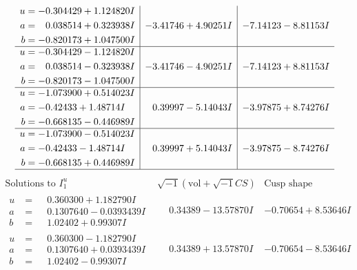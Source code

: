 \documentclass[1p]{elsarticle_modified}
\theoremstyle{definition}
\newcommand{\I}{\sqrt{-1}}
\begin{document}
$$\begin{array}{c|c|c}
\begin{aligned}
u &= -0.304429 + 1.124820 I \\
a &= \phantom{-}0.038514 + 0.323938 I \\
b &= -0.820173 + 1.047500 I\end{aligned}
 & -3.41746 + 4.90251 I & -7.14123 - 8.81153 I \\ \hline\begin{aligned}
u &= -0.304429 - 1.124820 I \\
a &= \phantom{-}0.038514 - 0.323938 I \\
b &= -0.820173 - 1.047500 I\end{aligned}
 & -3.41746 - 4.90251 I & -7.14123 + 8.81153 I \\ \hline\begin{aligned}
u &= -1.073900 + 0.514023 I \\
a &= -0.42433 + 1.48714 I \\
b &= -0.668135 - 0.446989 I\end{aligned}
 & \phantom{-}0.39997 - 5.14043 I & -3.97875 + 8.74276 I \\ \hline\begin{aligned}
u &= -1.073900 - 0.514023 I \\
a &= -0.42433 - 1.48714 I \\
b &= -0.668135 + 0.446989 I\end{aligned}
 & \phantom{-}0.39997 + 5.14043 I & -3.97875 - 8.74276 I\\
 \hline 
 \end{array}$$\newpage$$\begin{array}{c|c|c}  
\text{Solutions to }I^u_{1}& \I (\text{vol} + \sqrt{-1}CS) & \text{Cusp shape}\\
 \hline 
\begin{aligned}
u &= \phantom{-}0.360300 + 1.182790 I \\
a &= \phantom{-}0.1307640 - 0.0393439 I \\
b &= \phantom{-}1.02402 + 0.99307 I\end{aligned}
 & \phantom{-}0.34389 - 13.57870 I & -0.70654 + 8.53646 I \\ \hline\begin{aligned}
u &= \phantom{-}0.360300 - 1.182790 I \\
a &= \phantom{-}0.1307640 + 0.0393439 I \\
b &= \phantom{-}1.02402 - 0.99307 I\end{aligned}
 & \phantom{-}0.34389 + 13.57870 I & -0.70654 - 8.53646 I \\ \hline\begin{aligned}

\end{aligned}
\end{array}$$
\end{document}
